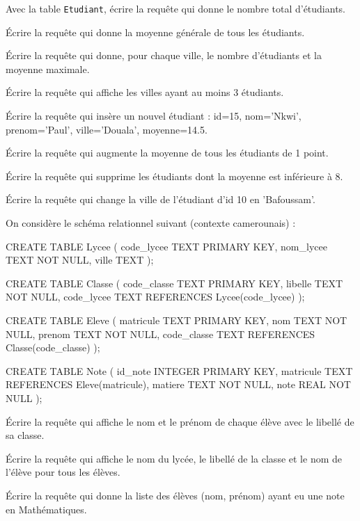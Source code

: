 
\exo{}
Avec la table \texttt{Etudiant}, écrire la requête qui donne le nombre total d'étudiants.

\exo{}
Écrire la requête qui donne la moyenne générale de tous les étudiants.

\exo{}
Écrire la requête qui donne, pour chaque ville, le nombre d'étudiants et la moyenne maximale.

\exo{}
Écrire la requête qui affiche les villes ayant au moins 3 étudiants.


\exo{}
Écrire la requête qui insère un nouvel étudiant : id=15, nom='Nkwi', prenom='Paul', ville='Douala', moyenne=14.5.

\exo{}
Écrire la requête qui augmente la moyenne de tous les étudiants de 1 point.

\exo{}
Écrire la requête qui supprime les étudiants dont la moyenne est inférieure à 8.

\exo{}
Écrire la requête qui change la ville de l'étudiant d'id 10 en 'Bafoussam'.


On considère le schéma relationnel suivant (contexte camerounais) :
\begin{sqlcode}
CREATE TABLE Lycee (
    code_lycee TEXT PRIMARY KEY,
    nom_lycee TEXT NOT NULL,
    ville TEXT
);

CREATE TABLE Classe (
    code_classe TEXT PRIMARY KEY,
    libelle TEXT NOT NULL,
    code_lycee TEXT REFERENCES Lycee(code_lycee)
);

CREATE TABLE Eleve (
    matricule TEXT PRIMARY KEY,
    nom TEXT NOT NULL,
    prenom TEXT NOT NULL,
    code_classe TEXT REFERENCES Classe(code_classe)
);

CREATE TABLE Note (
    id_note INTEGER PRIMARY KEY,
    matricule TEXT REFERENCES Eleve(matricule),
    matiere TEXT NOT NULL,
    note REAL NOT NULL
);
\end{sqlcode}

\exo{}
Écrire la requête qui affiche le nom et le prénom de chaque élève avec le libellé de sa classe.

\exo{}
Écrire la requête qui affiche le nom du lycée, le libellé de la classe et le nom de l'élève pour tous les élèves.

\exo{}
Écrire la requête qui donne la liste des élèves (nom, prénom) ayant eu une note en Mathématiques.


